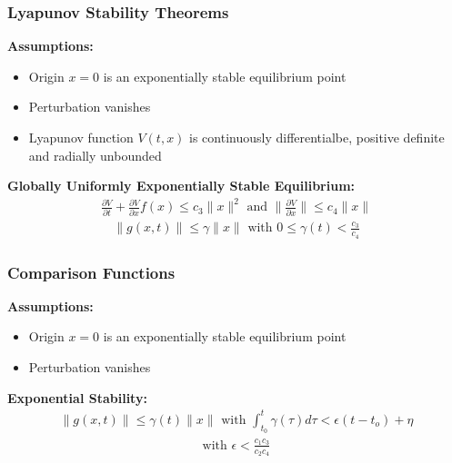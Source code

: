 \documentclass[student, noshadow, lsr, english, aspectratio=169, t]{ITR_LSR_slides}
\begin{document}
\begin{frame}
	\frametitle{Lyapunov Stability Theorems}
	\textbf{Assumptions:}
	\begin{itemize}
		\item Origin $x=0$ is an exponentially stable equilibrium point
		\item Perturbation vanishes
		\item Lyapunov function $V(t,x)$ is continuously differentialbe, positive definite and radially unbounded
	\end{itemize}
	\vspace{0.5cm}
	\textbf{Globally Uniformly Exponentially Stable Equilibrium:}
	\begin{align*}
		\frac{\partial V}{\partial t}+\frac{\partial V}{\partial x}f(x) \leq c_3\|x\|^2 \text{ and }\|\frac{\partial V}{\partial x}\| \leq c_4\|x\|
	\end{align*}
	\begin{align*}
		\|g(x,t)\| \leq \gamma\|x\| \text{ with }0\leq\gamma(t)<\frac{c_3}{c_4}
	\end{align*}

\end{frame}

\begin{frame}
	\frametitle{Comparison Functions}
	\textbf{Assumptions:}
	\begin{itemize}
		\item Origin $x=0$ is an exponentially stable equilibrium point
		\item Perturbation vanishes
	\end{itemize}
	\vspace{0.5cm}
	\textbf{Exponential Stability:}
	\begin{align*}
		\|g(x,t)\| \leq \gamma(t)\|x\| \text{ with }\int_{t_0}^{t}\gamma(\tau)d\tau<\epsilon(t-t_o)+\eta
	\end{align*}
	\begin{align*}
		\text{with } \epsilon < \frac{c_1c_3}{c_2c_4}
	\end{align*}
\end{frame}
\end{document}
